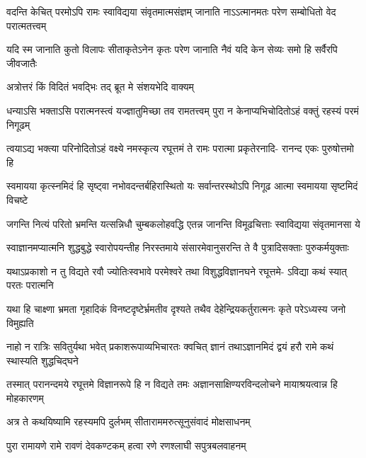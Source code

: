 \fourlineindentedshloka
{वदन्ति केचित् परमोऽपि रामः}
{स्वाविद्यया संवृतमात्मसंज्ञम्}
{जानाति नाऽऽत्मानमतः परेण}
{सम्बोधितो वेद परात्मतत्त्वम्} %

\fourlineindentedshloka
{यदि स्म जानाति कुतो विलापः}
{सीताकृतेऽनेन कृतः परेण}
{जानाति नैवं यदि केन सेव्यः}
{समो हि सर्वैरपि जीवजातैः} %

\twolineshloka
{अत्रोत्तरं किं विदितं भवद्भिः\hspace{12pt}}
{\hspace{12pt}तद् ब्रूत मे संशयभेदि वाक्यम्} %


\fourlineindentedshloka
{धन्याऽसि भक्ताऽसि परात्मनस्त्वं}
{यज्ज्ञातुमिच्छा तव रामतत्त्वम्}
{पुरा न केनाप्यभिचोदितोऽहं}
{वक्तुं रहस्यं परमं निगूढम्} %

\fourlineindentedshloka
{त्वयाऽद्य भक्त्या परिनोदितोऽहं}
{वक्ष्ये नमस्कृत्य रघूत्तमं ते}
{रामः परात्मा प्रकृतेरनादि-}
{रानन्द एकः पुरुषोत्तमो हि} %

\fourlineindentedshloka
{स्वमायया कृत्स्नमिदं हि सृष्ट्वा}
{नभोवदन्तर्बहिरास्थितो यः}
{सर्वान्तरस्थोऽपि निगूढ आत्मा}
{स्वमायया सृष्टमिदं विचष्टे} %

\fourlineindentedshloka
{जगन्ति नित्यं परितो भ्रमन्ति}
{यत्सन्निधौ चुम्बकलोहवद्धि}
{एतन्न जानन्ति विमूढचित्ताः}
{स्वाविद्यया संवृतमानसा ये} %

\fourlineindentedshloka
{स्वाज्ञानमप्यात्मनि शुद्धबुद्धे}
{स्वारोपयन्तीह निरस्तमाये}
{संसारमेवानुसरन्ति ते वै}
{पुत्रादिसक्ताः पुरुकर्मयुक्ताः} %

\fourlineindentedshloka
{यथाऽप्रकाशो न तु विद्यते रवौ}
{ज्योतिःस्वभावे परमेश्वरे तथा}
{विशुद्धविज्ञानघने रघूत्तमे-}
{ऽविद्या कथं स्यात् परतः परात्मनि} %

\fourlineindentedshloka
{यथा हि चाक्ष्णा भ्रमता गृहादिकं}
{विनष्टदृष्टेर्भ्रमतीव दृश्यते}
{तथैव देहेन्द्रियकर्तुरात्मनः}
{कृते परेऽध्यस्य जनो विमुह्यति} %

\fourlineindentedshloka
{नाहो न रात्रिः सवितुर्यथा भवेत्}
{प्रकाशरूपाव्यभिचारतः क्वचित्}
{ज्ञानं तथाऽज्ञानमिदं द्वयं हरौ}
{रामे कथं स्थास्यति शुद्धचिद्घने} %

\fourlineindentedshloka
{तस्मात् परानन्दमये रघूत्तमे}
{विज्ञानरूपे हि न विद्यते तमः}
{अज्ञानसाक्षिण्यरविन्दलोचने}
{मायाश्रयत्वान्न हि मोहकारणम्} %

\twolineshloka
{अत्र ते कथयिष्यामि रहस्यमपि दुर्लभम्}
{सीताराममरुत्सूनुसंवादं मोक्षसाधनम्} %

\twolineshloka
{पुरा रामायणे रामे रावणं देवकण्टकम्}
{हत्वा रणे रणश्लाघी सपुत्रबलवाहनम्} %


